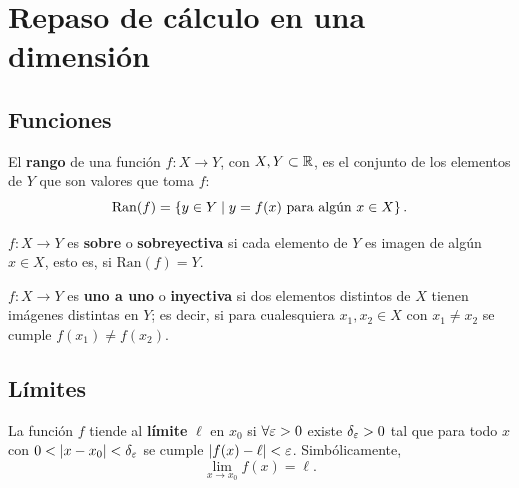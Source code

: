 \section{Repaso de c\'alculo en una dimensi\'on}
\label{sec:repaso_calculo}

\subsection{Funciones}
\label{subsec:funciones}

\begin{definicion}[Rango]
  \label{def:rango}
  El \textbf{rango} de una funci\'on $f:X\rightarrow Y$, con
  $X,Y\subset\mathbb{R}$, es el conjunto de los elementos de $Y$ que son valores que
  toma $f$:
  \begin{equation}
    \label{eq:rango}
    \mathrm{Ran}(f)=\left\{ y\in Y\mid y=f(x)\ \text{para alg\'un}\ x\in X \right\}.
  \end{equation}
\end{definicion}

\begin{definicion}[Sobreyectiva]
  \label{def:sobreyectiva}
  $f:X\rightarrow Y$ es \textbf{sobre} o \textbf{sobreyectiva} si cada elemento
  de $Y$ es imagen de alg\'un $x\in X$, esto es, si $\mathrm{Ran}(f)=Y$.
\end{definicion}

\begin{definicion}[Inyectiva]
  \label{def:inyectiva}
  $f:X\rightarrow Y$ es \textbf{uno a uno} o \textbf{inyectiva} si dos
  elementos distintos de $X$ tienen im\'agenes distintas en $Y$; es decir, si
  para cualesquiera $x_1,x_2\in X$ con $x_1\neq x_2$ se cumple
  $f(x_1)\neq f(x_2)$.
\end{definicion}

\subsection{L\'imites}
\label{subsec:limites_1d}

\begin{definicion}[L\'imite]
  \label{def:limite_1d}
  La funci\'on $f$ tiende al \textbf{l\'imite} $\ell$ en $x_0$ si
  $\forall\varepsilon>0$ existe $\delta_\varepsilon>0$ tal que para todo $x$ con
  $0<\lvert x-x_0 \rvert<\delta_\varepsilon$ se cumple $\lvert f(x)-\ell \rvert<\varepsilon$. Simb\'olicamente,
  \begin{equation}
    \label{eq:limite_1d}
    \lim_{x\rightarrow x_0}f(x)=\ell .
  \end{equation}
\end{definicion}

